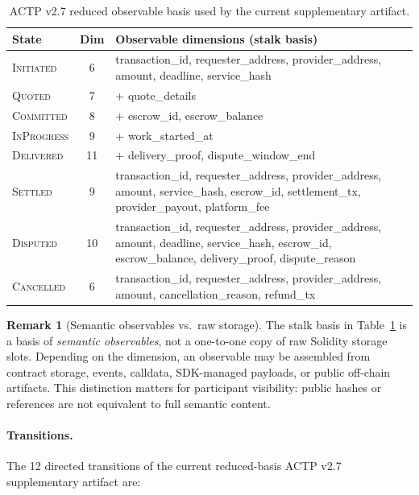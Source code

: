 \documentclass[11pt]{article}
\theoremstyle{plain}
\theoremstyle{definition}
\newtheorem{remark}[theorem]{Remark}
\newcommand{\sINIT}{\textsc{Initiated}}
\newcommand{\sQUOT}{\textsc{Quoted}}
\newcommand{\sCOMM}{\textsc{Committed}}
\newcommand{\sINPROG}{\textsc{InProgress}}
\newcommand{\sDELIV}{\textsc{Delivered}}
\newcommand{\sSETTL}{\textsc{Settled}}
\newcommand{\sDISP}{\textsc{Disputed}}
\newcommand{\sCANC}{\textsc{Cancelled}}
\begin{document}
\begin{table}[h]
\centering
\caption{ACTP v2.7 reduced observable basis used by the current supplementary artifact.}
\label{tab:states}
\small
\begin{tabular}{@{}lcp{7.5cm}@{}}
\toprule
\textbf{State} & \textbf{Dim} & \textbf{Observable dimensions (stalk basis)} \\
\midrule
\sINIT    & 6 & transaction\_id, requester\_address, provider\_address, amount, deadline, service\_hash \\
\sQUOT   & 7 & + quote\_details \\
\sCOMM   & 8 & + escrow\_id, escrow\_balance \\
\sINPROG & 9 & + work\_started\_at \\
\sDELIV  & 11 & + delivery\_proof, dispute\_window\_end \\
\sSETTL  & 9 & transaction\_id, requester\_address, provider\_address, amount, service\_hash, escrow\_id, settlement\_tx, provider\_payout, platform\_fee \\
\sDISP   & 10 & transaction\_id, requester\_address, provider\_address, amount, deadline, service\_hash, escrow\_id, escrow\_balance, delivery\_proof, dispute\_reason \\
\sCANC   & 6  & transaction\_id, requester\_address, provider\_address, amount, cancellation\_reason, refund\_tx \\
\bottomrule
\end{tabular}
\end{table}

\begin{remark}[Semantic observables vs.\ raw storage]
The stalk basis in Table~\ref{tab:states} is a basis of \emph{semantic
observables}, not a one-to-one copy of raw Solidity storage slots.  Depending
on the dimension, an observable may be assembled from contract storage,
events, calldata, SDK-managed payloads, or public off-chain artifacts.  This
distinction matters for participant visibility: public hashes or references
are not equivalent to full semantic content.
\end{remark}

\paragraph{Transitions.}
The 12 directed transitions of the current reduced-basis ACTP v2.7 supplementary artifact are:
\end{document}
